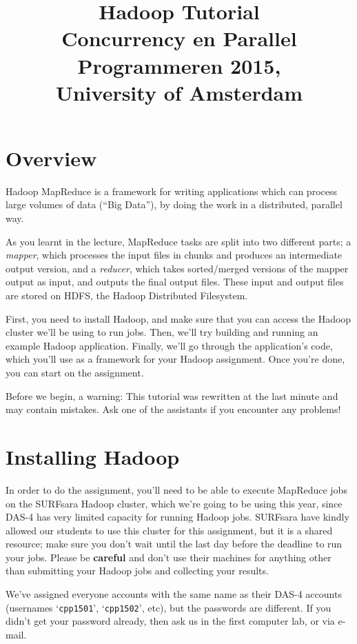 \documentclass[a4paper,11pt]{article}
\date{}
\title{Hadoop Tutorial\\
  Concurrency en Parallel Programmeren 2015,\\
  University of Amsterdam
}
\begin{document}
  \maketitle
  
  \tableofcontents
  
  \section{Overview}
  
  Hadoop MapReduce is a framework for writing applications which can process large volumes of data (``Big Data''), by doing the work in a distributed,
  parallel way.

  As you learnt in the lecture, MapReduce tasks are split into two different parts; a \emph{mapper}, which processes the input files in chunks and
  produces an intermediate output version, and a \emph{reducer}, which takes sorted/merged versions of the mapper output as input, and outputs
  the final output files. These input and output files are stored on HDFS, the Hadoop Distributed Filesystem.

  First, you need to install Hadoop, and make sure that you can access the Hadoop cluster we'll be using to run jobs.
  Then, we'll try building and running an example Hadoop application. Finally, we'll go through the application's code, which
  you'll use as a framework for your Hadoop assignment. Once you're done, you can start on the assignment.

  Before we begin, a warning: This tutorial was rewritten at the last minute and may contain mistakes. Ask one of the assistants
  if you encounter any problems!

  \pagebreak
  \section{Installing Hadoop}

  In order to do the assignment, you'll need to be able to execute MapReduce jobs on the SURFsara Hadoop cluster, which we're going to be using
  this year, since DAS-4 has very limited capacity for running Hadoop jobs. SURFsara have kindly allowed our students to use this cluster for this
  assignment, but it is a shared resource; make sure you don't wait until the last day before the deadline to run your jobs. Please be
  \textbf{careful} and don't use their machines for anything other than submitting your Hadoop jobs and collecting your results.

  We've assigned everyone accounts with the same name as their DAS-4 accounts (usernames `\texttt{cpp1501}', `\texttt{cpp1502}', etc), but the passwords
  are different. If you didn't get your password already, then ask us in the first computer lab, or via e-mail.
\end{document}
